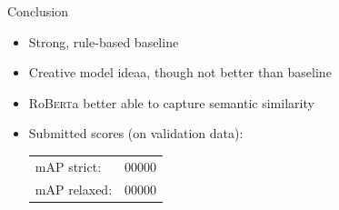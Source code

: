\documentclass[english,handout]{mlutalk}
\newcommand{\Roberta}{\mbox{Ro\textsc{Bert}a}\xspace}
\begin{document}
\begin{frame}{Conclusion}
  \begin{itemize}
    \item Strong, rule-based baseline
    \item Creative model ideaa, though not better than baseline
    \item \Roberta better able to capture semantic similarity
    \item Submitted scores (on validation data): \\
    \begin{tabular}{@{}lc}
      mAP strict: & 00000 \\
      mAP relaxed: & 00000
    \end{tabular}
  \end{itemize}
\end{frame}

\appendix
\section{\appendixname}

\bibliographyframe
\end{document}
